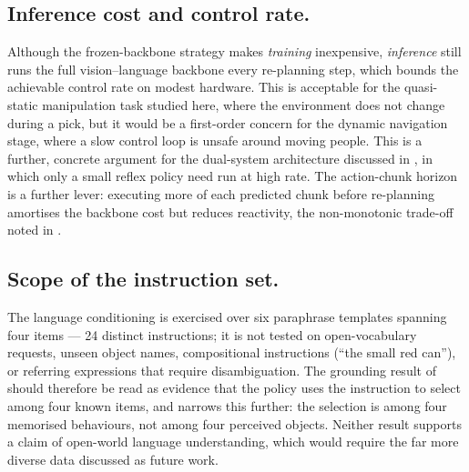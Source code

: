 \subsection{Inference cost and control rate.} Although the frozen-backbone strategy
makes \emph{training} inexpensive, \emph{inference} still runs the full
vision--language backbone every re-planning step, which bounds the achievable control
rate on modest hardware. This is acceptable for the quasi-static manipulation task
studied here, where the environment does not change during a pick, but it would be a
first-order concern for the dynamic navigation stage, where a slow control loop is
unsafe around moving people. This is a further, concrete argument for the dual-system
architecture discussed in , in which only a small reflex policy
need run at high rate. The action-chunk horizon is a further lever: executing more of
each predicted chunk before re-planning amortises the backbone cost but reduces
reactivity, the non-monotonic trade-off noted in .

\subsection{Scope of the instruction set.} The language conditioning is exercised over
six paraphrase templates spanning four items --- 24 distinct instructions; it is not
tested on open-vocabulary requests, unseen object names, compositional instructions
(``the small red can''), or referring expressions that require disambiguation. The
grounding result of  should therefore be read as evidence
that the policy uses the instruction to select among four known items, and
 narrows this further: the selection is among four
memorised behaviours, not among four perceived objects. Neither result supports a
claim of open-world language understanding, which would require the far more diverse
data discussed as future work.

